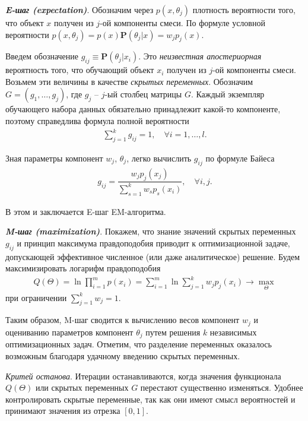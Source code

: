 \documentclass[%
	11pt,
	a4paper,
	utf8,
		]{article}
\begin{document}
\emph{\bfseries E-шаг (expectation)}. Обозначим через $ p(x, \theta_j) $ плотность вероятности того, что объект $ x $ получен из $ j $-ой компоненты смеси. По формуле условной вероятности $ p(x, \theta_j) = p(x) \mathbf{P}(\theta_j | x) = w_j p_j(x) $.

Введем обозначение $ g_{ij} \equiv \mathbf{P}(\theta_j | x_i) $. Это \emph{неизвестная апостериорная} вероятность того, что обучающий объект $ x_i $ получен из $ j $-ой компоненты смеси. Возьмем эти величины в качестве \emph{скрытых переменных}. Обозначим $ G = (g_1, \ldots, g_j) $, где $ g_j $ -- $ j $-ый столбец матрицы $ G $. Каждый экземпляр обучающего набора данных обязательно принадлежит какой-то компоненте, поэтому справедлива формула полной вероятности
\begin{align*}
	\sum_{j=1}^{k} g_{ij} = 1, \quad \forall i = 1, \ldots, l.
\end{align*}

Зная параметры компонент $ w_j $, $ \theta_j $, легко вычислить $ g_{ij} $ по формуле Байеса
\begin{align*}
	g_{ij} = \dfrac{ w_j p_j(x_j) }{ \sum_{s=1}^{k} w_s p_s(x_i) }, \quad \forall i, j.
\end{align*}

В этом и заключается E-шаг EM-алгоритма.

\emph{\bfseries M-шаг (maximization)}. Покажем, что знание значений скрытых переменных $ g_{ij} $ и принцип максимума правдоподобия приводит к оптимизационной задаче, допускающей эффективное численное (или даже аналитическое) решение. Будем максимизировать логарифм правдоподобия
\begin{align*}
	Q(\Theta) = \ln \prod_{i=1}^{m} p(x_i) = \sum_{i=1}^{m} \ln \sum_{j=1}^{k} w_j p_j(x_i) \to \underset{\Theta}{\max}
\end{align*}
при ограничении $ \sum\limits_{j=1}^{k} w_j = 1 $.

Таким образом, M-шаг сводится к вычислению весов компонент $ w_j $ и оцениванию параметров компонент $ \theta_j $ путем решения $ k $ независимых оптимизационных задач. Отметим, что разделение переменных оказалось возможным благодаря удачному введению скрытых переменных.

\emph{Критей останова}. Итерации останавливаются, когда значения функционала $ Q(\Theta) $ или скрытых переменных $ G $ перестают существенно изменяться. Удобнее контролировать скрытые переменные, так как они имеют смысл вероятностей и принимают значения из отрезка $ [0, 1] $.
\end{document}
